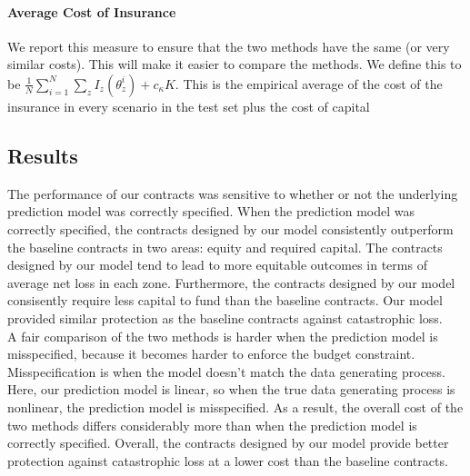 \documentclass[11pt]{article}
\begin{document}
    \paragraph*{Average Cost of Insurance} We report this measure to ensure that the two methods have the same (or very similar costs). This will make it easier to compare the methods. We define this to be $\frac{1}{N}\sum_{i=1}^N \sum_z I_z(\theta^i_z) + c_{\kappa} K$. This is the empirical average of the cost of the insurance in every scenario in the test set plus the cost of capital

  \subsection{Results}
  The performance of our contracts was sensitive to whether or not the underlying prediction model was correctly specified. When the prediction model was correctly specified, the contracts designed by our model consistently outperform the baseline contracts in two areas: equity and required capital. The contracts designed by our model tend to lead to more equitable outcomes in terms of average net loss in each zone. Furthermore, the contracts designed by our model consisently require less capital to fund than the baseline contracts. Our model provided similar protection as the baseline contracts against catastrophic loss. \\
  A fair comparison of the two methods is harder when the prediction model is misspecified, because it becomes harder to enforce the budget constraint. Misspecification is when the model doesn't match the data generating process. Here, our prediction model is linear, so when the true data generating process is nonlinear, the prediction model is misspecified. As a result, the overall cost of the two methods differs considerably more than when the prediction model is correctly specified. Overall, the contracts designed by our model provide better protection against catastrophic loss at a lower cost than the baseline contracts. 
\end{document}
